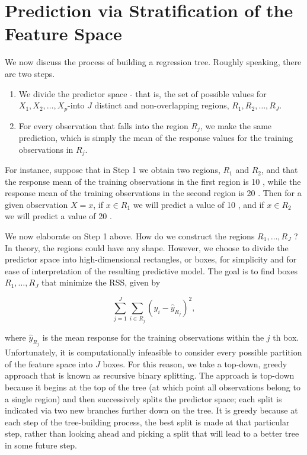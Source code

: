 \documentclass[10pt]{article}
\begin{document}
\section*{Prediction via Stratification of the Feature Space}
We now discuss the process of building a regression tree. Roughly speaking, there are two steps.

\begin{enumerate}
  \item We divide the predictor space - that is, the set of possible values for $X_{1}, X_{2}, \ldots, X_{p}$-into $J$ distinct and non-overlapping regions, $R_{1}, R_{2}, \ldots, R_{J}$.
  \item For every observation that falls into the region $R_{j}$, we make the same prediction, which is simply the mean of the response values for the training observations in $R_{j}$.
\end{enumerate}

For instance, suppose that in Step 1 we obtain two regions, $R_{1}$ and $R_{2}$, and that the response mean of the training observations in the first region is 10 , while the response mean of the training observations in the second region is 20 . Then for a given observation $X=x$, if $x \in R_{1}$ we will predict a value of 10 , and if $x \in R_{2}$ we will predict a value of 20 .

We now elaborate on Step 1 above. How do we construct the regions $R_{1}, \ldots, R_{J}$ ? In theory, the regions could have any shape. However, we choose to divide the predictor space into high-dimensional rectangles, or boxes, for simplicity and for ease of interpretation of the resulting predictive model. The goal is to find boxes $R_{1}, \ldots, R_{J}$ that minimize the RSS, given by


\begin{equation*}
\sum_{j=1}^{J} \sum_{i \in R_{j}}\left(y_{i}-\hat{y}_{R_{j}}\right)^{2}, \tag{8.1}
\end{equation*}


where $\hat{y}_{R_{j}}$ is the mean response for the training observations within the $j$ th box. Unfortunately, it is computationally infeasible to consider every possible partition of the feature space into $J$ boxes. For this reason, we take a top-down, greedy approach that is known as recursive binary splitting. The approach is top-down because it begins at the top of the tree (at which point all observations belong to a single region) and then successively splits the predictor space; each split is indicated via two new branches further down on the tree. It is greedy because at each step of the tree-building process, the best split is made at that particular step, rather than looking ahead and picking a split that will lead to a better tree in some future step.
\end{document}
